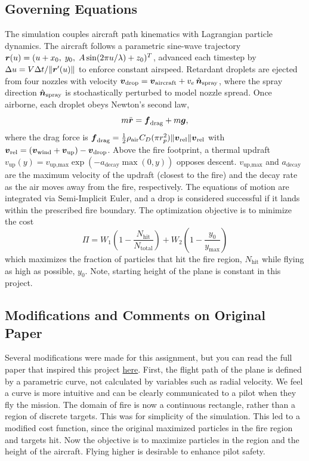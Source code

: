 \documentclass{article}
\begin{document}
\subsection*{Governing Equations}
The simulation couples aircraft path kinematics with Lagrangian particle dynamics. The aircraft follows a parametric sine-wave trajectory $\mbox{\boldmath $r$}(u) = (u + x_0,\; y_0,\; A\sin(2\pi u/\lambda) + z_0)^T$, advanced each timestep by $\Delta u = V\Delta t / \|\mbox{\boldmath $r$}'(u)\|$ to enforce constant airspeed. Retardant droplets are ejected from four nozzles with velocity $\mbox{\boldmath $v$}_\text{drop} = \mbox{\boldmath $v$}_\text{aircraft} + v_e\,\hat{\mbox{\boldmath $n$}}_\text{spray}$, where the spray direction $\hat{\mbox{\boldmath $n$}}_\text{spray}$ is stochastically perturbed to model nozzle spread. Once airborne, each droplet obeys Newton's second law,
\begin{equation}
    m\ddot{\mbox{\boldmath $r$}} = \mbox{\boldmath $f$}_\text{drag} + m\mbox{\boldmath $g$},
\end{equation}
where the drag force is $\mbox{\boldmath $f$}_\text{drag} = \frac{1}{2}\rho_\text{air} C_D (\pi r_p^2)\|\mbox{\boldmath $v$}_\text{rel}\|\mbox{\boldmath $v$}_\text{rel}$ with $\mbox{\boldmath $v$}_\text{rel} = (\mbox{\boldmath $v$}_\text{wind} + \mbox{\boldmath $v$}_\text{up}) - \mbox{\boldmath $v$}_\text{drop}$. Above the fire footprint, a thermal updraft $v_\text{up}(y) = v_{\text{up,max}}\exp(-a_{\text{decay}}\max(0,y))$ opposes descent. $v_{\text{up,max}}$ and $a_{\text{decay}}$ are the maximum velocity of the updraft (closest to the fire) and the decay rate as the air moves away from the fire, respectively. The equations of motion are integrated via Semi-Implicit Euler, and a drop is considered successful if it lands within the prescribed fire boundary. The optimization objective is to minimize the cost 
\begin{equation}
    \Pi = W_1\left(1 - \frac{N_\text{hit}}{N_\text{total}} \right) + W_2\left(1 - \frac{y_0}{y_{\text{max}}} \right)
\end{equation}
which maximizes the fraction of particles that hit the fire region, $N_{\text{hit}}$ while flying as high as possible, $y_0$. Note, starting height of the plane is constant in this project.



\subsection*{Modifications and Comments on Original Paper}
Several modifications were made for this assignment, but you can read the full paper that inspired this project \href{https://msol.berkeley.edu/wp-content/uploads/2023/10/181.pdf}{here}. First, the flight path of the plane is defined by a parametric curve, not calculated by variables such as radial velocity. We feel a curve is more intuitive and can be clearly communicated to a pilot when they fly the mission. The domain of fire is now a continuous rectangle, rather than a region of discrete targets. This was for simplicity of the simulation. This led to a modified cost function, since the original maximized particles in the fire region and targets hit. Now the objective is to maximize particles in the region and the height of the aircraft. Flying higher is desirable to enhance pilot safety. 
\end{document}
